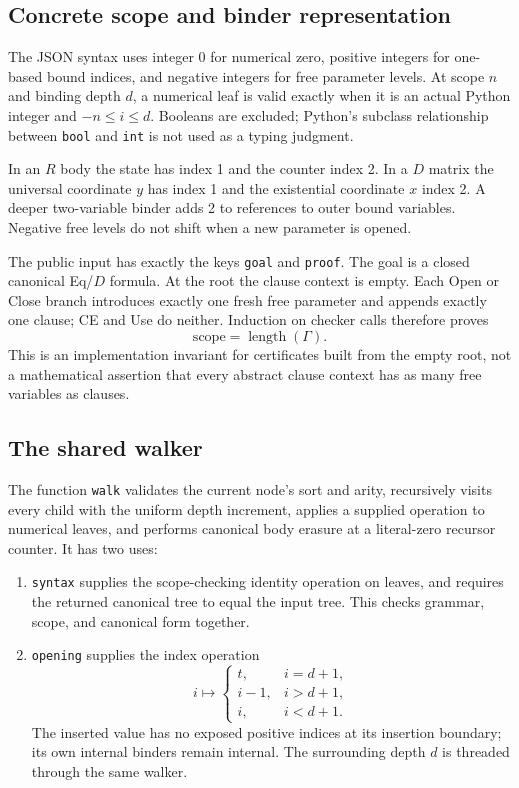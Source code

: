 \documentclass[10pt,letterpaper]{article}
\theoremstyle{definition}
\theoremstyle{remark}
\begin{document}
\subsection{Concrete scope and binder representation}

The JSON syntax uses integer $0$ for numerical zero, positive integers for
one-based bound indices, and negative integers for free parameter levels.
At scope $n$ and binding depth $d$, a numerical leaf is valid exactly when
it is an actual Python integer and $-n\le i\le d$. Booleans are excluded;
Python's subclass relationship between \texttt{bool} and \texttt{int} is
not used as a typing judgment.

In an $R$ body the state has index 1 and the counter index 2. In a $D$
matrix the universal coordinate $y$ has index 1 and the existential
coordinate $x$ index 2. A deeper two-variable binder adds 2 to references
to outer bound variables. Negative free levels do not shift when a new
parameter is opened.

The public input has exactly the keys \texttt{goal} and \texttt{proof}.
The goal is a closed canonical Eq/$D$ formula. At the root the clause
context is empty. Each Open or Close branch introduces exactly one
fresh free parameter and appends exactly one clause; CE and Use do neither.
Induction on checker calls therefore proves
\[
                  \text{scope}=\operatorname{length}(\Gamma).
\]
This is an implementation invariant for certificates built from the empty
root, not a mathematical assertion that every abstract clause context
has as many free variables as clauses.

\subsection{The shared walker}

The function \texttt{walk} validates the current node's sort and arity,
recursively visits every child with the uniform depth increment, applies
a supplied operation to numerical leaves, and performs canonical body
erasure at a literal-zero recursor counter. It has two uses:
\begin{enumerate}
\item \texttt{syntax} supplies the scope-checking identity operation on
leaves, and requires the returned canonical tree to equal the input tree.
This checks grammar, scope, and canonical form together.
\item \texttt{opening} supplies the index operation
\[
 i\longmapsto
 \begin{cases}
 t,&i=d+1,\\
 i-1,&i>d+1,\\
 i,&i<d+1.
 \end{cases}
\]
The inserted value has no exposed positive indices at its insertion
boundary; its own internal binders remain internal. The surrounding
depth $d$ is threaded through the same walker.
\end{enumerate}
\end{document}
